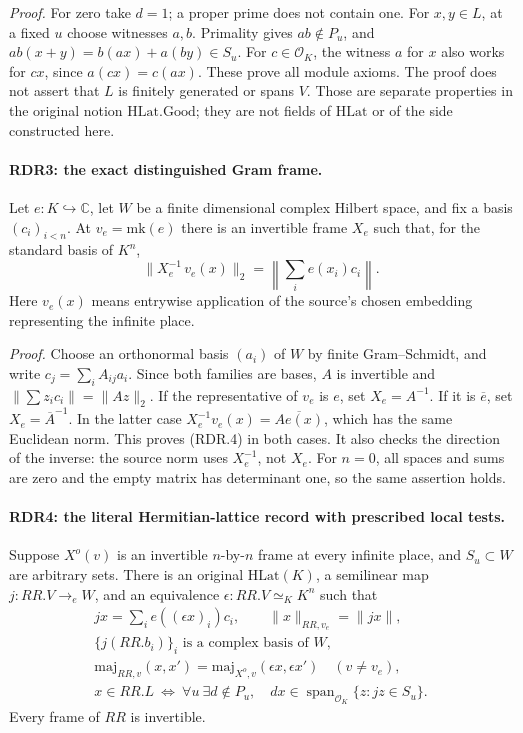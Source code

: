 \emph{Proof.}
For zero take \(d=1\); a proper prime does not contain one.
For \(x,y\in L\), at a fixed \(u\) choose witnesses \(a,b\).
Primality gives \(ab\notin P_u\), and
\(ab(x+y)=b(ax)+a(by)\in S_u\).  For \(c\in\mathcal O_K\),
the witness \(a\) for \(x\) also works for \(cx\), since
\(a(cx)=c(ax)\).  These prove all module axioms.  The proof
does not assert that \(L\) is finitely generated or spans \(V\).
Those are separate properties in the original notion
\(\mathrm{HLat.Good}\); they are not fields of \(\mathrm{HLat}\)
or of the side constructed here.

\paragraph{RDR3: the exact distinguished Gram frame.}
\label{claim:RDR3}
Let \(e:K\hookrightarrow\mathbb C\), let \(W\) be a finite
dimensional complex Hilbert space, and fix a basis
\((c_i)_{i<n}\).  At \(v_e=\mathrm{mk}(e)\) there is an
invertible frame \(X_e\) such that, for the standard basis of
\(K^n\),
\[
 \bigl\|X_e^{-1}\,v_e(x)\bigr\|_2
                =\left\|\sum_i e(x_i)c_i\right\|.           \tag{RDR.4}
\]
Here \(v_e(x)\) means entrywise application of the source's chosen
embedding representing the infinite place.

\emph{Proof.}
Choose an orthonormal basis \((a_i)\) of \(W\) by finite
Gram--Schmidt, and write \(c_j=\sum_i A_{ij}a_i\).
Since both families are bases, \(A\) is invertible and
\(\|\sum z_ic_i\|=\|Az\|_2\).  If the representative of
\(v_e\) is \(e\), set \(X_e=A^{-1}\).  If it is
\(\overline e\), set \(X_e=\overline A^{-1}\).  In the latter
case \(X_e^{-1}v_e(x)=\overline{Ae(x)}\), which has the same
Euclidean norm.  This proves (RDR.4) in both cases.  It also
checks the direction of the inverse: the source norm uses
\(X_e^{-1}\), not \(X_e\).  For \(n=0\), all spaces and
sums are zero and the empty matrix has determinant one, so
the same assertion holds.

\paragraph{RDR4: the literal Hermitian-lattice record with prescribed local tests.}
\label{claim:RDR4}
Suppose \(X^o(v)\) is an invertible \(n\)-by-\(n\) frame at
every infinite place, and \(S_u\subset W\) are arbitrary sets.
There is an original \(\mathrm{HLat}(K)\), a semilinear map
\(j:RR.V\to_e W\), and an equivalence
\(\epsilon:RR.V\simeq_K K^n\) such that
\[
\begin{gathered}
 jx=\sum_i e((\epsilon x)_i)c_i,\qquad
 \|x\|_{RR,v_e}=\|jx\|,\\
 \{j(RR.b_i)\}_i\text{ is a complex basis of }W,\\
 \mathrm{maj}_{RR,v}(x,x')
   =\mathrm{maj}_{X^o,v}(\epsilon x,\epsilon x')
                                      \quad(v\ne v_e),       \tag{RDR.5}\\
 x\in RR.L\ \Longleftrightarrow\
 \forall u\ \exists d\notin P_u,
     \quad dx\in\operatorname{span}_{\mathcal O_K}
                              \{z:jz\in S_u\}.
\end{gathered}
\]
Every frame of \(RR\) is invertible.

